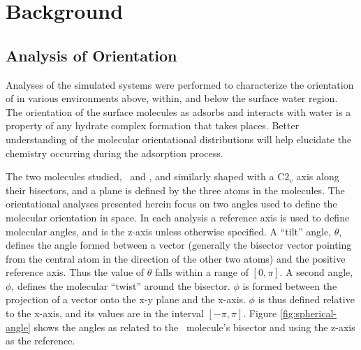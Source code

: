 \section{Background}

\subsection{Analysis of Orientation}

	Analyses of the simulated systems were performed to characterize the orientation of \suldiox in various environments above, within, and below the surface water region. The orientation of the surface molecules as \suldiox adsorbs and interacts with water is a property of any hydrate complex formation that takes places. Better understanding of the molecular orientational distributions will help elucidate the chemistry occurring during the adsorption process.

	The two molecules studied, \wat~and \suldiox, and similarly shaped with a C2$_v$ axis along their bisectors, and a plane is defined by the three atoms in the molecules. The orientational analyses presented herein focus on two angles used to define the molecular orientation in space. In each analysis a reference axis is used to define molecular angles, and is the z-axis unless otherwise specified. A ``tilt'' angle, $\theta$, defines the angle formed between a vector (generally the bisector vector pointing from the central atom in the direction of the other two atoms) and the positive reference axis. Thus the value of $\theta$ falls within a range of $[0,\pi]$. A second angle, $\phi$, defines the molecular ``twist'' around the bisector. $\phi$ is formed between the projection of a vector onto the x-y plane and the x-axis. $\phi$ is thus defined relative to the x-axis, and its values are in the interval $[-\pi,\pi]$. Figure \ref{fig:spherical-angle} shows the angles as related to the \suldiox~molecule's bisector and using the z-axis as the reference.

